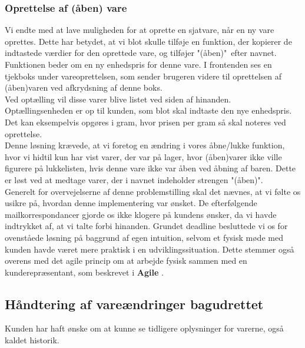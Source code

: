 \documentclass[]{article}
\begin{document}
\subsubsection{Oprettelse af (åben) vare}
\noindent Vi endte med at lave muligheden for at oprette en sjatvare, når en ny vare oprettes. Dette har betydet, at vi blot skulle tilføje en funktion, der kopierer de indtastede værdier for den oprettede vare, og tilføjer "(åben)"\, efter navnet. Funktionen beder om en ny enhedspris for denne vare. I frontenden ses en tjekboks under vareoprettelsen, som sender brugeren videre til oprettelsen af (åben)varen ved afkrydsning af denne boks. \\
Ved optælling vil disse varer blive listet ved siden af hinanden. Optællingsenheden er op til kunden, som blot skal indtaste den nye enhedspris. Det kan eksempelvis opgøres i gram, hvor prisen per gram så skal noteres ved oprettelse. \\
Denne løsning krævede, at vi foretog en ændring i vores åbne/lukke funktion, hvor vi hidtil kun har vist varer, der var på lager, hvor (åben)varer ikke ville figurere på lukkelisten, hvis denne vare ikke var åben ved åbning af baren. Dette er løst ved at medtage varer, der i navnet indeholder strengen "(åben)". \\
%
Generelt for overvejelserne af denne problemstilling skal det nævnes, at vi følte os usikre på, hvordan denne implementering var ønsket. De efterfølgende mailkorrespondancer gjorde os ikke klogere på kundens ønsker, da vi havde indtrykket af, at vi talte forbi hinanden. Grundet deadline besluttede vi os for ovenståede løsning på baggrund af egen intuition, selvom et fysisk møde med kunden havde været mere praktisk i en udviklingssituation. Dette stemmer også overens med det agile princip om at arbejde fysisk sammen med en kunderepræsentant, som beskrevet i \textbf{Agile} \cite{martin2006agile}.

\subsection{Håndtering af vareændringer bagudrettet}
Kunden har haft ønske om at kunne se tidligere oplysninger for varerne, også kaldet historik.
\end{document}
